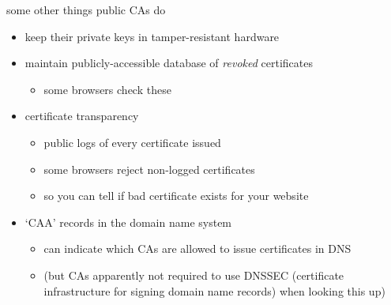\begin{frame}{some other things public CAs do}
    \begin{itemize}
    \item keep their private keys in tamper-resistant hardware
    \item maintain publicly-accessible database of \textit{revoked} certificates
        \begin{itemize}
        \item some browsers check these
        \end{itemize}
    \item certificate transparency
        \begin{itemize}
            \item public logs of every certificate issued
            \item some browsers reject non-logged certificates
            \item so you can tell if bad certificate exists for your website
        \end{itemize}
    \item `CAA' records in the domain name system
        \begin{itemize}
        \item can indicate which CAs are allowed to issue certificates in DNS
        \item (but CAs apparently not required to use DNSSEC (certificate infrastructure for signing domain name records) when looking this up)
        \end{itemize}
    \end{itemize}
\end{frame}
